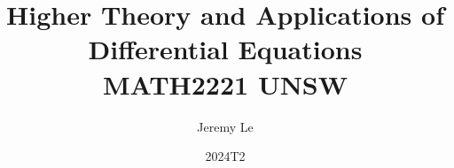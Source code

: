 \documentclass[12pt, letterpaper]{book}
\title{Higher Theory and Applications of Differential Equations \\ MATH2221 UNSW}
\author{Jeremy Le}
\date{2024T2}
\begin{document}
\maketitle


\begin{minipage}{\textwidth}
    \vfill
    \tableofcontents
\end{minipage}


\end{document}
